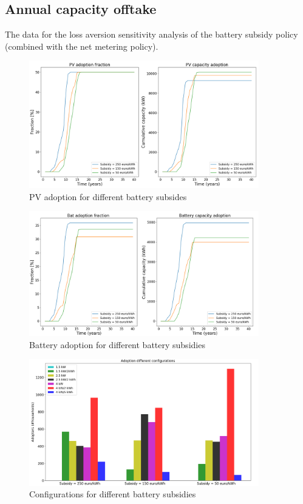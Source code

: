 \subsection{Annual capacity offtake}
The data for the loss aversion sensitivity analysis of the battery subsidy policy (combined with the net metering policy). 
\newline 
\begin{figure}[h!]
    \centering
    \includegraphics[width=10cm]{AppendixA/PVCapsubs.png}
    \caption{PV adoption for different battery subsides}
    \label{fig:}
\end{figure}
\noindent
\newline 
\begin{figure}[h!]
    \centering
    \includegraphics[width=10cm]{AppendixA/BatCapsubs.png}
    \caption{Battery adoption for different battery subsidies}
    \label{fig:}
\end{figure}
\noindent
\newline 
\begin{figure}[h!]
    \centering
    \includegraphics[width=10cm]{AppendixA/ConfigCapsubs.png}
    \caption{Configurations for different battery subsidies}
    \label{fig:}
\end{figure}
